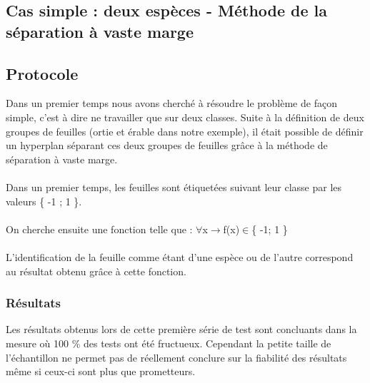 \subsection{Cas simple : deux espèces - Méthode de la séparation à vaste marge}
\subsection{Protocole}
Dans un premier temps nous avons cherché à résoudre le problème de façon simple, c'est à dire ne travailler que sur deux classes.
Suite à la définition de deux groupes de feuilles (ortie et érable dans notre exemple), il était possible de définir un hyperplan séparant ces deux groupes de feuilles grâce à la méthode de séparation à vaste marge.


\paragraph{}
Dans un premier temps, les feuilles sont étiquetées suivant leur classe par les valeurs \{ -1 ; 1 \}. 
\paragraph{}
On cherche ensuite une fonction telle que :
\smallbreak
 $\forall$x$\longrightarrow$f(x)$\in$\{ -1; 1 \}

\paragraph{}
L'identification de la feuille comme étant d'une espèce ou de l'autre correspond au résultat obtenu grâce à cette fonction.

\subsubsection{Résultats}
Les résultats obtenus lors de cette première série de test sont concluants dans la mesure où 100 \% des tests ont été fructueux. Cependant la petite taille de l'échantillon ne permet pas de réellement conclure sur la fiabilité des résultats même si ceux-ci sont plus que prometteurs.